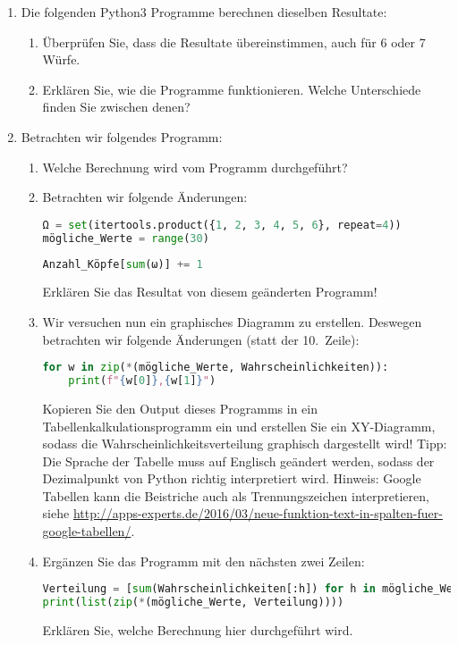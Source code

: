 \documentclass{article}
\begin{document}
\begin{enumerate}
\item Die folgenden Python3 Programme berechnen dieselben Resultate:



\begin{enumerate}
\item Überprüfen Sie, dass die Resultate übereinstimmen, auch für 6 oder 7 Würfe.
\item Erklären Sie, wie die Programme funktionieren. Welche Unterschiede finden Sie zwischen denen?
\end{enumerate}

\eject

\item Betrachten wir folgendes Programm:


\begin{enumerate}
\item Welche Berechnung wird vom Programm durchgeführt?
\item Betrachten wir folgende Änderungen:
\begin{lstlisting}[language=Python,firstnumber=2]
Ω = set(itertools.product({1, 2, 3, 4, 5, 6}, repeat=4))
mögliche_Werte = range(30)
\end{lstlisting}
\begin{lstlisting}[language=Python,firstnumber=8]
    Anzahl_Köpfe[sum(ω)] += 1
\end{lstlisting}
Erklären Sie das Resultat von diesem geänderten Programm!
\item Wir versuchen nun ein graphisches Diagramm zu erstellen. Deswegen
betrachten wir folgende Änderungen (statt der 10.~Zeile):
\begin{lstlisting}[language=Python,firstnumber=10]
for w in zip(*(mögliche_Werte, Wahrscheinlichkeiten)):
    print(f"{w[0]},{w[1]}")
\end{lstlisting}
Kopieren Sie den Output dieses Programms in ein Tabellenkalkulationsprogramm ein
und erstellen Sie ein XY-Diagramm, sodass die Wahrscheinlichkeitsverteilung
graphisch dargestellt wird! Tipp: Die Sprache der Tabelle muss auf Englisch
geändert werden, sodass der Dezimalpunkt von Python richtig interpretiert wird.
Hinweis: Google Tabellen kann die Beistriche auch als Trennungszeichen interpretieren,
siehe \url{http://apps-experts.de/2016/03/neue-funktion-text-in-spalten-fuer-google-tabellen/}.
\item Ergänzen Sie das Programm mit den nächsten zwei Zeilen:
\begin{lstlisting}[language=Python,firstnumber=12]
Verteilung = [sum(Wahrscheinlichkeiten[:h]) for h in mögliche_Werte]
print(list(zip(*(mögliche_Werte, Verteilung))))
\end{lstlisting}
Erklären Sie, welche Berechnung hier durchgeführt wird.
\end{enumerate}
\end{enumerate}
\end{document}
